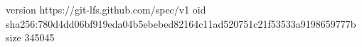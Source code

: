 version https://git-lfs.github.com/spec/v1
oid sha256:780d4dd06bf919eda04b5ebebed82164c11ad520751c21f53533a9198659777b
size 345045

